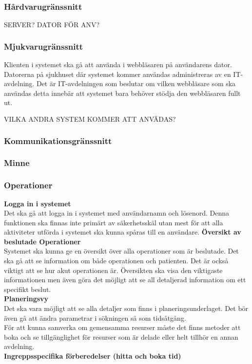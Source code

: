 \documentclass{article}
\begin{document}
\begin{enumerate}
\subsubsection{Hårdvarugränssnitt}
\label{subsec:Hardvarugranssnitt}
SERVER? DATOR FÖR ANV?
\subsubsection{Mjukvarugränssnitt}
\label{subsec:Mjukvarugranssnitt}
Klienten i systemet ska gå att använda i webbläsaren på användarens dator.
Datorerna på sjukhuset där systemet kommer användas administreras av en
IT-avdelning. Det är IT-avdelningen som beslutar om vilken webbläsare som ska
användas detta innebär att systemet bara behöver stödja den webbläsaren fullt
ut.

VILKA ANDRA SYSTEM KOMMER ATT ANVÄDAS?
\subsubsection{Kommunikationsgränssnitt}
\label{subsec:Kommunikationsgranssnitt}
\subsubsection{Minne}
\label{subsec:Minne}
\subsubsection{Operationer}
\label{subsec:Operationer}
\textbf{Logga in i systemet}\\
Det ska gå att logga in i systemet med användarnamn och lösenord. Denna
funktionen ska finnas inte primärt av säkerhetsskäl utan mest för att alla
aktiviteter utförda i systemet ska kunna spåras till en användare.
\textbf{Översikt av beslutade Operationer}\\
Systemet ska kunna ge en översikt över alla operationer som är beslutade.
Det ska gå att se information om både operationen och patienten. Det är också
viktigt att se hur akut operationen är. Översikten ska visa den viktigaste
informationen men även göra det möjligt att se all detaljerad information om ett specifikt beslut.\\
\textbf{Planeringsvy}\\
Det ska vara möjligt att se alla detaljer som finns i planeringsunderlaget.
Det bör även gå att ändra parametrar i sökningen så som tidsåtgång.\\
För att kunna samverka om gemensamma resurser måste det finns metoder att boka
och se tillgänglighet för resurser som är delade eller helt tillhör en annan
avdelning.\\
\textbf{Ingreppsspecifika förberedelser (hitta och boka tid)}\\


\end{enumerate}
\end{document}
